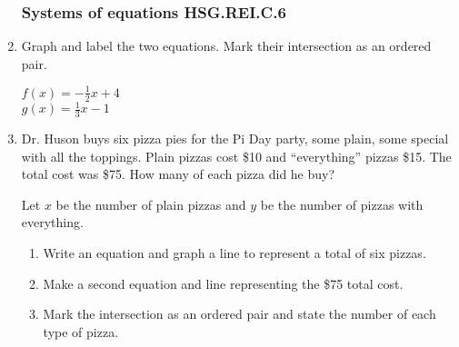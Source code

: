 \begin{enumerate}
\newpage
\subsubsection*{Systems of equations \hfill HSG.REI.C.6}
\item Graph and label the two equations. Mark their intersection as an ordered pair.
  \begin{multicols}{2}
    $f(x) = -\frac{1}{2}x+4$ \\[1cm]
    $g(x) = \frac{1}{3}x-1$ \\
\end{multicols}

  
\item Dr. Huson buys six pizza pies for the Pi Day party, some plain, some special with all the toppings. Plain pizzas cost \$10 and ``everything'' pizzas \$15. The total cost was \$75. How many of each pizza did he buy?
\begin{multicols}{2}
Let $x$ be the number of plain pizzas and $y$ be the number of pizzas with everything.
\begin{enumerate}
  \item Write an equation and graph a line to represent a total of six pizzas.
  \item Make a second equation and line representing the \$75 total cost.
  \item Mark the intersection as an ordered pair and state the number of each type of pizza.
\end{enumerate}
  \begin{flushright}
     \vspace{2cm}
  \end{flushright}
\end{multicols}


\end{enumerate}
